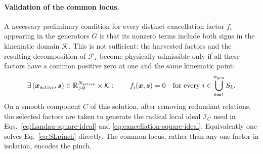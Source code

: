 \documentclass[a4paper,11pt]{article}
\newcommand{\x}{\boldsymbol{x}}
\newcommand{\s}{\boldsymbol{s}}
\newcommand{\K}{\mathcal K}
\newcommand{\Rpos}{\mathbb R_{>0}}
\newcommand{\ideal}{\mathcal I}
\begin{document}
\paragraph{Validation of the common locus.}

A necessary preliminary condition for every distinct cancellation factor
\(f_i\) appearing in the generators \(G\) is that its nonzero terms include
both signs in the kinematic domain \(\K\).  This is not sufficient: the
harvested factors and the resulting decomposition of \(\mathcal F_\star\)
become physically admissible only if all these factors have a common positive
zero at one and the same kinematic point:
\begin{equation}
 \exists\,(\x_{\rm active},\s)
 \in\Rpos^{N_{\rm active}}\times\K:
 \qquad
 f_i(\x,\s)=0
 \quad\text{for every }i\in\bigcup_{k=1}^{n_{\rm gen}}S_k.
\label{eq:commonzero}
\end{equation}
On a smooth component \(C\) of this solution, after removing redundant
relations, the selected factors are taken to generate the radical local ideal
\(\ideal_C\) used in Eqs.~\eqref{eq:Landau-square-ideal} and
\eqref{eq:cancellation-square-ideal}.
Equivalently one solves Eq.~\eqref{eq:SLpinch} directly.  The common locus,
rather than any one factor in isolation, encodes the pinch.
\end{document}
